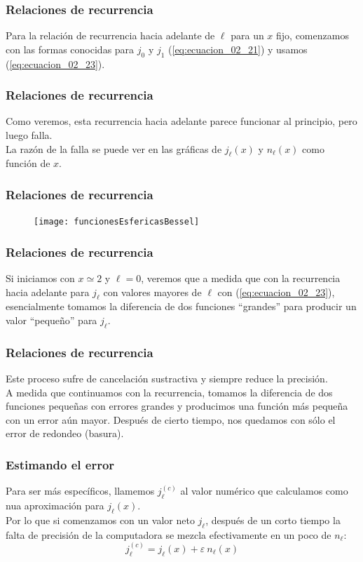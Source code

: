 \begin{frame}
\frametitle{Relaciones de recurrencia}
Para la relación de recurrencia hacia adelante de $\ell$ para un $x$ fijo, comenzamos con las formas conocidas para $j_{0}$ y $j_{1}$ (\ref{eq:ecuacion_02_21}) y usamos (\ref{eq:ecuacion_02_23}).
\end{frame}
\begin{frame}
\frametitle{Relaciones de recurrencia}
Como veremos, esta recurrencia hacia adelante parece funcionar al principio, pero luego falla.
\\
\bigskip
La razón de la falla se puede ver en las gráficas de $j_{\ell}(x)$ y $n_{\ell}(x)$ como función de $x$.
\end{frame}
\begin{frame}
\frametitle{Relaciones de recurrencia}
\begin{figure}
\centering
\texttt{[image: funcionesEsfericasBessel]}
\end{figure}
\end{frame}
\begin{frame}
\frametitle{Relaciones de recurrencia}
 Si iniciamos con  $x \simeq 2$ y $\ell = 0$, veremos que a medida que con la  recurrencia hacia adelante para  $j_{\ell}$ con valores mayores de $\ell$ con (\ref{eq:ecuacion_02_23}), esencialmente tomamos la diferencia de dos funciones \enquote{grandes} para producir un valor \enquote{pequeño} para $j_{\ell}$.
\end{frame}
\begin{frame}
\frametitle{Relaciones de recurrencia}
Este proceso sufre de cancelación sustractiva y siempre reduce la precisión.
\\
\bigskip
A medida que continuamos con la recurrencia, tomamos la diferencia de dos funciones pequeñas con errores grandes y producimos una función más pequeña con un error aún mayor. Después de cierto tiempo, nos quedamos con sólo el error de redondeo (basura).
\end{frame}
\begin{frame}
\frametitle{Estimando el error}
Para ser más específicos, llamemos $j_{\ell}^{(c)}$ al valor numérico que calculamos como nua aproximación para $j_{\ell}(x)$.
\\
\bigskip
Por lo que si comenzamos con un valor neto $j_{\ell}$, después de un corto tiempo la falta de precisión de la computadora se mezcla efectivamente en un poco de $n_{\ell}$:
\begin{equation}
j_{\ell}^{(c)} = j_{\ell} (x) + \varepsilon \: n_{\ell} (x)
\label{eq:ecuacion_02_25}	
\end{equation}
\end{frame}
